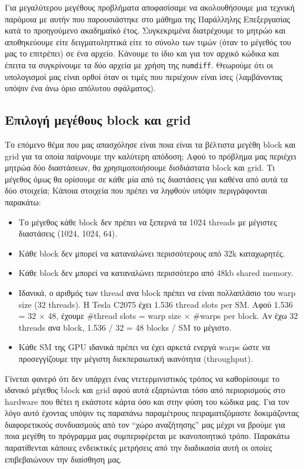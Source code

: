 Για μεγαλύτερου μεγέθους προβλήματα αποφασίσαμε να ακολουθήσουμε μια τεχνική παρόμοια με αυτήν που παρουσιάστηκε στο μάθημα της Παράλληλης Επεξεργασίας κατά το προηγούμενο ακαδημαϊκό έτος. Συγκεκριμένα διατρέχουμε το μητρώο και αποθηκεύουμε είτε δειγματοληπτικά είτε το σύνολο των τιμών (όταν το μέγεθός του μας το επιτρέπει) σε ένα αρχείο. Κάνουμε το ίδιο και για τον αρχικό κώδικα και έπειτα τα συγκρίνουμε τα δύο αρχεία με χρήση της \texttt{numdiff}. Θεωρούμε ότι οι υπολογισμοί μας είναι ορθοί όταν οι τιμές που περιέχουν είναι ίσες (λαμβάνοντας υπόψιν ένα άνω όριο απόλυτου σφάλματος).

\vspace{-0.3cm}

\subsection*{Επιλογή μεγέθους block και grid}

Το επόμενο θέμα που μας απασχόλησε είναι ποια είναι τα βέλτιστα μεγέθη block και grid για τα οποία παίρνουμε την καλύτερη απόδοση; Αφού το πρόβλημα μας περιέχει μητρώα δύο διαστάσεων, θα χρησιμοποιήσουμε δισδιάστατα block και grid. Τι μέγεθος όμως θα ορίσουμε σε κάθε μία από τις διαστάσεις για καθένα από αυτά τα δύο στοιχεία; Κάποια στοιχεία που πρέπει να ληφθούν υπόψιν περιγράφονται παρακάτω:

\begin{itemize}
    \item Το μέγεθος κάθε block δεν πρέπει να ξεπερνά τα 1024 threads με μέγιστες διαστάσεις (1024, 1024, 64).
    \item Κάθε block δεν μπορεί να καταναλώνει περισσότερους από 32k καταχωρητές.
    \item Κάθε block δεν μπορεί να καταναλώνει περισσότερο από 48kb shared memory.
    \item Ιδανικά, ο αριθμός των thread ανα block πρέπει να είναι πολλαπλάσιο του warp size (32 threads).
    H Tesla C2075 έχει 1.536 thread slots per SM. Αφού 1.536 = 32 × 48, έχουμε \#thread slots = warp size × \#warps per block. Αν έχω 32 threads ανα block, 1.536 / 32 = 48 blocks / SM το μέγιστο.
    
    \item Κάθε SM της GPU ιδανικά πρέπει να έχει αρκετά ενεργά warps ώστε να προσεγγίζουμε την μέγιστη διεκπεραιωτική ικανότητα (throughput).
\end{itemize}

Γίνεται φανερό ότι δεν υπάρχει ένας ντετερμινιστικός τρόπος να καθορίσουμε το ιδανικό μέγεθος block και grid αφού αυτά εξαρτώνται τόσο από περιορισμούς στο hardware που θέτει η εκάστοτε κάρτα όσο και στην φύση του κώδικα μας. Για τον λόγο αυτό έχοντας υπόψιν τις παραπάνω παραμέτρους πειραματιζόμαστε δοκιμάζοντας διαφορετικούς συνδυασμούς από τον ``χώρο αναζήτησης'' μας μέχρι να βρούμε για ποια μεγέθη το πρόγραμμα μας συμπεριφέρεται με ικανοποιητικό τρόπο. Παρακάτω παρατίθενται κάποιες ενδεικτικές μετρήσεις από την διαδικασία αυτή οι οποίες επιβεβαιώνουν την διαίσθηση μας.

